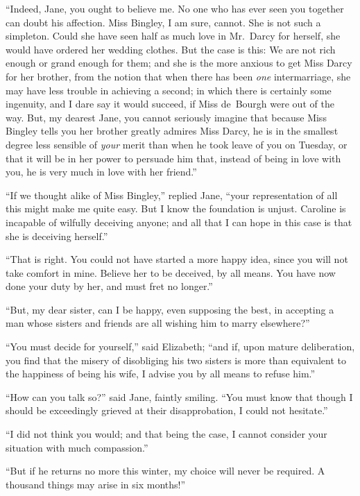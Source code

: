 ``Indeed, Jane, you ought to believe me.  No one who has ever
seen you together can doubt his affection.  Miss Bingley, I am
sure, cannot.  She is not such a simpleton.  Could she have seen
half as much love in Mr.\ Darcy for herself, she would have
ordered her wedding clothes.  But the case is this: We are not
rich enough or grand enough for them; and she is the more
anxious to get Miss Darcy for her brother, from the notion that
when there has been \emph{one} intermarriage, she may have less
trouble in achieving a second; in which there is certainly some
ingenuity, and I dare say it would succeed, if Miss de~Bourgh
were out of the way.  But, my dearest Jane, you cannot seriously
imagine that because Miss Bingley tells you her brother greatly
admires Miss Darcy, he is in the smallest degree less sensible
of \emph{your} merit than when he took leave of you on Tuesday, or
that it will be in her power to persuade him that, instead of
being in love with you, he is very much in love with her friend.''

``If we thought alike of Miss Bingley,'' replied Jane, ``your
representation of all this might make me quite easy.  But I know
the foundation is unjust.  Caroline is incapable of wilfully
deceiving anyone; and all that I can hope in this case is that
she is deceiving herself.''

``That is right.  You could not have started a more happy idea,
since you will not take comfort in mine.  Believe her to be
deceived, by all means.  You have now done your duty by her,
and must fret no longer.''

``But, my dear sister, can I be happy, even supposing the best, in
accepting a man whose sisters and friends are all wishing him to
marry elsewhere?''

``You must decide for yourself,'' said Elizabeth; ``and if, upon
mature deliberation, you find that the misery of disobliging his
two sisters is more than equivalent to the happiness of being his
wife, I advise you by all means to refuse him.''

``How can you talk so?'' said Jane, faintly smiling.  ``You must
know that though I should be exceedingly grieved at their
disapprobation, I could not hesitate.''

``I did not think you would; and that being the case, I cannot
consider your situation with much compassion.''

``But if he returns no more this winter, my choice will never be
required.  A thousand things may arise in six months!''

